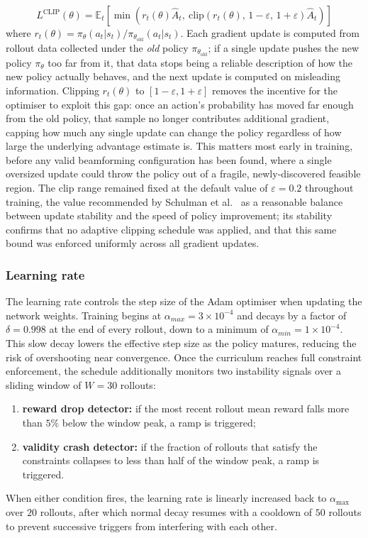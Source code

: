 \begin{equation}
    L^{\mathrm{CLIP}}(\theta) = \mathbb{E}_t \left[ \min \left( r_t(\theta)\hat{A}_t,\ \mathrm{clip}(r_t(\theta),\, 1 - \varepsilon,\, 1 + \varepsilon)\hat{A}_t \right) \right]
\end{equation}
where $r_t(\theta) = \pi_\theta(a_t | s_t)/ \pi_{\theta_\mathrm{old}}(a_t | s_t)$. Each gradient update is computed from rollout data collected under the \emph{old} policy $\pi_{\theta_\mathrm{old}}$; if a single update pushes the new policy $\pi_\theta$ too far from it, that data stops being a reliable description of how the new policy actually behaves, and the next update is computed on misleading information. Clipping $r_t(\theta)$ to $[1-\varepsilon, 1+\varepsilon]$ removes the incentive for the optimiser to exploit this gap: once an action's probability has moved far enough from the old policy, that sample no longer contributes additional gradient, capping how much any single update can change the policy regardless of how large the underlying advantage estimate is. This matters most early in training, before any valid beamforming configuration has been found, where a single oversized update could throw the policy out of a fragile, newly-discovered feasible region. The clip range remained fixed at the default value of $\varepsilon = 0.2$ throughout training, the value recommended by Schulman et al.~\cite{schulman2017ppo} as a reasonable balance between update stability and the speed of policy improvement; its stability confirms that no adaptive clipping schedule was applied, and that this same bound was enforced uniformly across all gradient updates.

\subsubsection{Learning rate}
The learning rate controls the step size of the Adam optimiser when updating the network weights. Training begins at $\alpha_{max} = 3 \times 10^{-4}$ and decays by a factor of $\delta = 0.998$ at the end of every rollout, down to a minimum of $\alpha_{min} = 1 \times 10^{-4}$. This slow decay lowers the effective step size as the policy matures, reducing the risk of overshooting near convergence. Once the curriculum reaches full constraint enforcement, the schedule additionally monitors two instability signals over a sliding window of $W = 30$ rollouts:
\begin{enumerate}
    \item \textbf{reward drop detector:} if the most recent rollout mean reward falls more than $5\%$ below the window peak, a ramp is triggered;
    \item \textbf{validity crash detector:} if the fraction of rollouts that satisfy the constraints collapses to less than half of the window peak, a ramp is triggered.
\end{enumerate}
When either condition fires, the learning rate is linearly increased back to $\alpha_{\max}$ over $20$ rollouts, after which normal decay resumes with a cooldown of $50$ rollouts to prevent successive triggers from interfering with each other.

